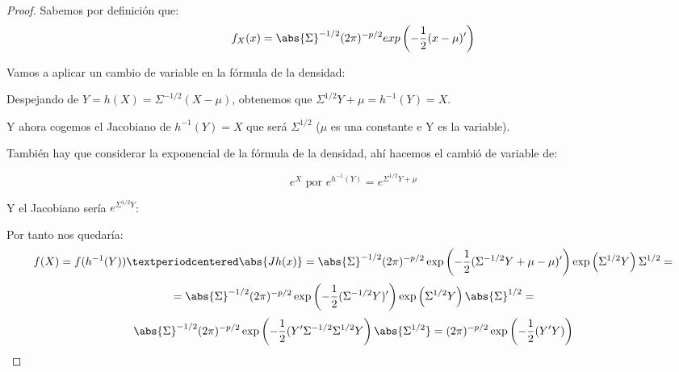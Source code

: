 \begin{proof}
Sabemos por definición que:
\[
f_X(x)=\abs{\Sigma}^{-1/2}(2\pi)^{-p/2} exp \left( -\frac{1}{2}(x-\mu)' \right)
\]

Vamos a aplicar un cambio de variable en la fórmula de la densidad:

Despejando de $Y = h(X)= \Sigma^{-1/2}(X-\mu)$, obtenemos que $\Sigma^{1/2}Y+\mu=h^{-1}(Y)=X$.

Y ahora cogemos el Jacobiano de $h^{-1}(Y)=X$ que será $\Sigma^{1/2}$ ($\mu$ es una constante e Y es la variable).

También hay que considerar la exponencial de la fórmula de la densidad, ahí hacemos el cambió de variable de:

$$e^X \text{ por } e^{h^{-1}(Y)}=e^{\Sigma^{1/2}Y+\mu}$$

Y el Jacobiano sería $e^{\Sigma^{1/2}Y}$:


Por tanto nos quedaría:
\[
f(X) = f(h^{-1}(Y))·\abs{Jh(x)} = \abs{\Sigma}^{-1/2}(2 \pi)^{-p/2} \exp\left(-\frac{1}{2}(\Sigma^{-1/2}Y+\mu-\mu)'  \right) \exp\left( \Sigma^{1/2}Y \right) \Sigma^{1/2}  =
\]
\[
= \abs{\Sigma}^{-1/2}(2 \pi)^{-p/2} \exp\left(-\frac{1}{2}(\Sigma^{-1/2}Y)' \right) \exp\left( \Sigma^{1/2}Y \right) \abs{\Sigma}^{1/2} =
\]
\[
\abs{\Sigma}^{-1/2}(2 \pi)^{-p/2} \exp\left(-\frac{1}{2}(Y'\Sigma^{-1/2}\Sigma^{1/2}Y \right) \abs{\Sigma^{1/2}} = (2 \pi)^{-p/2} \exp\left(-\frac{1}{2}(Y'Y) \right)
\]
\end{proof}



